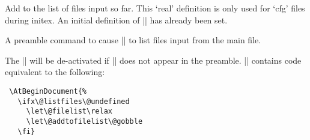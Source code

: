 \begin{multicols}
 \begin{macro}{\@addtofilelist}
 Add to the  list of files input so far.
 This `real' definition is only used for `cfg' files during initex.
 An initial definition of |\@gobble| has already been set.
 \end{macro}
    \begin{teX}
\def\@addtofilelist#1{\xdef\@filelist{\@filelist,#1}}
    \end{teX}

\begin{macro}{\listfiles}
 A preamble command to cause || to list files input
 from the main file.
\end{macro}
    \begin{teX}
\def\listfiles{%
  \let\listfiles\relax
  \def\@listfiles##1##2##3##4##5##6##7##8##9\@@{%
     \def\reserved@d{\\}%
     \@tfor\reserved@c:=##1##2##3##4##5##6##7##8\do{%
       \ifx\reserved@c\reserved@d
         \edef\filename@area{ \filename@area}%
       \fi}}%
    \end{teX}

\begin{macro}{\@dofilelist}
\end{macro}

    \begin{teX}
  \def\@dofilelist{%
     \typeout{^^J *File List*}%
     \@for\@currname:=\@filelist\do{%
       \filename@parse\@currname
       \edef\reserved@a{%
          \filename@base.%
          \ifx\filename@ext\relax tex\else\filename@ext\fi}%
       \expandafter\let\expandafter\reserved@b
                              \csname ver@\reserved@a\endcsname
       \expandafter\expandafter\expandafter\@listfiles\expandafter
             \filename@area\filename@base\\\\\\\\\\\\\\\\\\\@@
       \typeout{%
         \filename@area\reserved@a
         \ifx\reserved@b\relax\else\@spaces\reserved@b\fi}}%
     \typeout{ ***********^^J}}}
    \end{teX}


 The |\@filelist| will be de-activated if |\listfiles| does not
 appear in the preamble. || contains code equivalent
 to the following:
\begin{verbatim}
 \AtBeginDocument{%
   \ifx\@listfiles\@undefined
     \let\@filelist\relax
     \let\@addtofilelist\@gobble
   \fi}
\end{verbatim}


\end{multicols}
